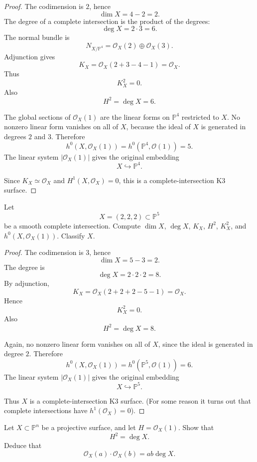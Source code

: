 \begin{proof}
The codimension is $2$, hence
$$
  \dim X=4-2=2.
$$
The degree of a complete intersection is
the product of the degrees:
$$
  \deg X=2\cdot 3=6.
$$
The normal bundle is
$$
  N_{X/\mathbb P^4}
  =
  \mathcal O_X(2)\oplus \mathcal O_X(3).
$$
Adjunction gives
$$
  K_X
  =
  \mathcal O_X(2+3-4-1)
  =
  \mathcal O_X.
$$
Thus
$$
  K_X^2=0.
$$
Also
$$
  H^2=\deg X=6.
$$

The global sections of $\mathcal O_X(1)$
are the linear forms on $\mathbb P^4$
restricted to $X$. No nonzero linear form
vanishes on all of $X$, because the ideal
of $X$ is generated in degrees $2$ and
$3$. Therefore
$$
  h^0(X,\mathcal O_X(1))
  =
  h^0(\mathbb P^4,\mathcal O(1))
  =
  5.
$$
The linear system $|\mathcal O_X(1)|$
gives the original embedding
$$
  X\hookrightarrow \mathbb P^4.
$$

Since $K_X\simeq \mathcal O_X$ and
$H^1(X,\mathcal O_X)=0$, this is a
complete-intersection K3 surface.
\end{proof}

\begin{exercise}
\label{exercise-two-two-two-surface}
Let
$$
  X=(2,2,2)\subset \mathbb P^5
$$
be a smooth complete intersection.
Compute $\dim X$, $\deg X$, $K_X$,
$H^2$, $K_X^2$, and
$h^0(X,\mathcal O_X(1))$. Classify $X$.
\end{exercise}

\begin{proof}
The codimension is $3$, hence
$$
  \dim X=5-3=2.
$$
The degree is
$$
  \deg X=2\cdot 2\cdot 2=8.
$$
By adjunction,
$$
  K_X
  =
  \mathcal O_X(2+2+2-5-1)
  =
  \mathcal O_X.
$$
Hence
$$
  K_X^2=0.
$$
Also
$$
  H^2=\deg X=8.
$$

Again, no nonzero linear form vanishes
on all of $X$, since the ideal is
generated in degree $2$. Therefore
$$
  h^0(X,\mathcal O_X(1))
  =
  h^0(\mathbb P^5,\mathcal O(1))
  =
  6.
$$
The linear system $|\mathcal O_X(1)|$
gives the original embedding
$$
  X\hookrightarrow \mathbb P^5.
$$

Thus $X$ is a complete-intersection
K3 surface. (For some reason it turns out
that complete intersections have
$h^1(\mathcal{O}_X)=0$).
\end{proof}

\begin{exercise}
\label{exercise-surface-intersection}
Let $X\subset \mathbb P^n$ be a
projective surface, and let
$H=\mathcal O_X(1)$. Show that
$$
  H^2=\deg X.
$$
Deduce that
$$
  \mathcal O_X(a)\cdot\mathcal O_X(b)
  =
  ab\deg X.
$$
\end{exercise}

